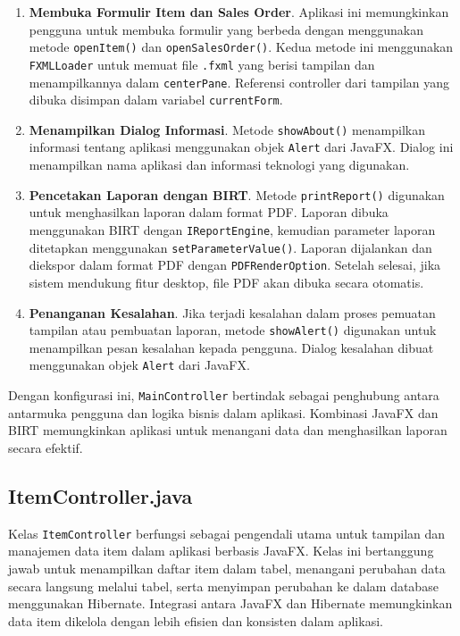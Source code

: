 \begin{enumerate}
	
	\item \textbf{Membuka Formulir Item dan Sales Order}.  
	Aplikasi ini memungkinkan pengguna untuk membuka formulir yang berbeda dengan menggunakan metode \texttt{openItem()} dan \texttt{openSalesOrder()}. Kedua metode ini menggunakan \texttt{FXMLLoader} untuk memuat file \texttt{.fxml} yang berisi tampilan dan menampilkannya dalam \texttt{centerPane}. Referensi controller dari tampilan yang dibuka disimpan dalam variabel \texttt{currentForm}.
	
	\item \textbf{Menampilkan Dialog Informasi}.  
	Metode \texttt{showAbout()} menampilkan informasi tentang aplikasi menggunakan objek \texttt{Alert} dari JavaFX. Dialog ini menampilkan nama aplikasi dan informasi teknologi yang digunakan.
	
	\item \textbf{Pencetakan Laporan dengan BIRT}.  
	Metode \texttt{printReport()} digunakan untuk menghasilkan laporan dalam format PDF. Laporan dibuka menggunakan BIRT dengan \texttt{IReportEngine}, kemudian parameter laporan ditetapkan menggunakan \texttt{setParameterValue()}. Laporan dijalankan dan diekspor dalam format PDF dengan \texttt{PDFRenderOption}. Setelah selesai, jika sistem mendukung fitur desktop, file PDF akan dibuka secara otomatis.
	
	\item \textbf{Penanganan Kesalahan}.  
	Jika terjadi kesalahan dalam proses pemuatan tampilan atau pembuatan laporan, metode \texttt{showAlert()} digunakan untuk menampilkan pesan kesalahan kepada pengguna. Dialog kesalahan dibuat menggunakan objek \texttt{Alert} dari JavaFX.
\end{enumerate}

Dengan konfigurasi ini, \texttt{MainController} bertindak sebagai penghubung antara antarmuka pengguna dan logika bisnis dalam aplikasi. Kombinasi JavaFX dan BIRT memungkinkan aplikasi untuk menangani data dan menghasilkan laporan secara efektif. 

\subsection{ItemController.java}

Kelas \texttt{ItemController} berfungsi sebagai pengendali utama untuk tampilan dan manajemen data item dalam aplikasi berbasis JavaFX. Kelas ini bertanggung jawab untuk menampilkan daftar item dalam tabel, menangani perubahan data secara langsung melalui tabel, serta menyimpan perubahan ke dalam database menggunakan Hibernate. Integrasi antara JavaFX dan Hibernate memungkinkan data item dikelola dengan lebih efisien dan konsisten dalam aplikasi.

